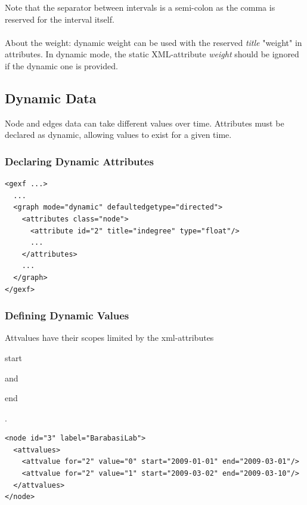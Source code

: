 \documentclass[a4paper,10pt]{article}
\begin{document}
Note that the separator between intervals is a semi-colon as the comma is reserved for the interval itself.

\paragraph{}
About the weight: dynamic weight can be used with the reserved \textit{title} "weight" in attributes. In dynamic mode, the static XML-attribute \textit{weight} should be ignored if the dynamic one is provided.

\subsection{Dynamic Data}

Node and edges data can take different values over time. Attributes must be declared as dynamic, allowing values to exist for a given time.

\subsubsection{Declaring Dynamic Attributes}

\lstset{ style=gexf }
\begin{lstlisting}[caption={Indegree may change over time}]
<gexf ...>
  ...
  <graph mode="dynamic" defaultedgetype="directed">
    <attributes class="node">
      <attribute id="2" title="indegree" type="float"/>
      ...
    </attributes>
    ...
  </graph>
</gexf>
\end{lstlisting}

\subsubsection{Defining Dynamic Values}

Attvalues have their scopes limited by the xml-attributes \begin{footnotesize}start\end{footnotesize} and \begin{footnotesize}end\end{footnotesize}.

\lstset{ style=gexf }
\begin{lstlisting}[caption={Data value changing over time}]
<node id="3" label="BarabasiLab">
  <attvalues>
    <attvalue for="2" value="0" start="2009-01-01" end="2009-03-01"/>
    <attvalue for="2" value="1" start="2009-03-02" end="2009-03-10"/>
  </attvalues>
</node>
\end{lstlisting}
\end{document}
